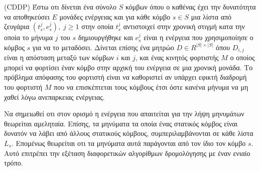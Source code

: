 \begin{definition}
(CDDP) Έστω οτι δίνεται ένα σύνολο $S$ κόμβων όπου ο καθένας έχει την δυνατότητα να αποθηκεύσει $E$ μονάδες ενέργειας και για κάθε κόμβο $s\in S$ μια λίστα από
ζευγάρια $(t_{s}^{j}, e_{s}^{j}),\; j\geq 1$ στην οποία $t_{s}^{j}$ αντιστοιχεί στην χρονική στιγμή κατα την οποία το μήνυμα $j$ του $s$ δημιουργήθηκε και $e^{j}_{s}$
είναι η ενέργεια που χρησιμοποίησε ο κόμβος $s$ για να το μεταδόσει. Δίνεται επίσης ένα μητρώο $D\in R^{|S|\times |S|}$ όπου $D_{i,j}$ είναι η απόσταση μεταξύ των
κόμβων $i$ και $j$, και ένας κινητός φορτιστής $M$ ο οποίος μπορεί να φορτίσει έναν κόμβο στην αρχική του ενέργεια σε μια χρονική μονάδα. Το πρόβλημα απόφασης του
φορτιστή είναι να  καθοριστεί αν υπάρχει εφικτή διαδρομή του φορτιστή $M$ που να επισκέπτεται τους κόμβους έτσι όστε κανένα μήνυμα να μη χαθεί λόγω ανεπαρκειας
ενέργειας.
\end{definition}
Να σημειωθεί οτι στον ορισμό η ενέργεια που απαιτείται για την λήψη μηνυμάτων θεωρείται αμεληταία. Επίσης, τα μηνύματα τα οποία ένας στατικός κόμβος είναι δυνατόν να
λάβει από άλλους στατικούς κόμβους, συμπεριλαμβάνονται σε κάθε λίστα $L_{s}$. Επομένως θεωρείται οτι τα μηνύματα αυτά παράγονται από τον ίδιο τον κόμβο $s$. Αυτό
επιτρέπει την εξέταση διαφορετικών αλγορίθμων δρομολόγησης με έναν ενιαίο τρόπο.

